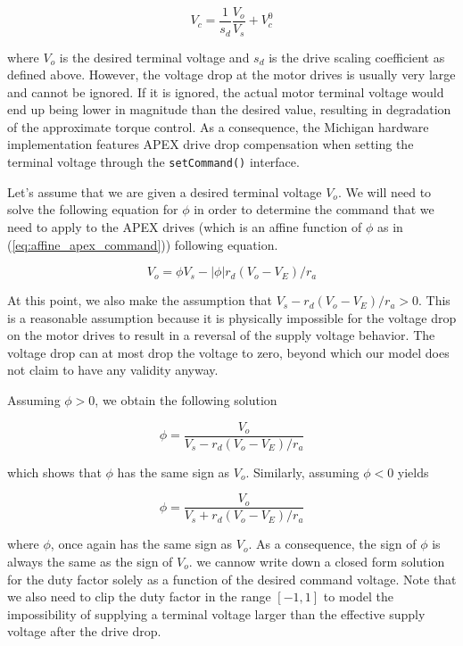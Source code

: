 \begin{equation*}
V_c = \frac{1}{s_d} \frac{V_o}{V_s} + V_c^0
\end{equation*}

\noindent where $V_o$ is the desired terminal voltage and $s_d$ is the drive
scaling coefficient as defined above. However, the voltage drop at the motor
drives is usually very large and cannot be ignored. If it is ignored, the
actual motor terminal voltage would end up being lower in magnitude than the
desired value, resulting in degradation of the approximate torque
control. As a consequence, the Michigan hardware implementation features 
APEX drive drop compensation when setting the terminal voltage through the
{\tt setCommand()} interface.

Let's assume that we are given a desired terminal voltage $V_o$. We will
need to solve the following equation for $\phi$ in order to determine the
command that we need to apply to the APEX drives (which is an affine
function of $\phi$ as in (\ref{eq:affine_apex_command})) following equation.

\begin{equation*}
V_o = \phi V_s - |\phi| r_d (V_o - V_E)/r_a
\end{equation*}

At this point, we also make the assumption that $V_s - r_d(V_o - V_E)/r_a >
0$. This is a reasonable assumption because it is physically impossible for
the voltage drop on the motor drives to result in a reversal of the supply
voltage behavior. The voltage drop can at most drop the voltage to zero,
beyond which our model does not claim to have any validity anyway.

Assuming $\phi > 0$, we obtain the following solution

\begin{equation*}
\phi = \frac{V_o}{V_s - r_d(V_o - V_E)/r_a}
\end{equation*}

\noindent which shows that $\phi$ has the same sign as $V_o$. Similarly,
assuming $\phi < 0$ yields
 
\begin{equation*}
\phi = \frac{V_o}{V_s + r_d(V_o - V_E)/r_a}
\end{equation*}

\noindent where $\phi$, once again has the same sign as $V_o$. As a
consequence, the sign of $\phi$ is always the same as the sign of $V_o$. we
cannow write down a closed form solution for the duty factor solely as a
function of the desired command voltage. Note that we also need to clip the
duty factor in the range $[-1, 1]$ to model the impossibility of supplying a
terminal voltage larger than the effective supply voltage after the drive
drop.


